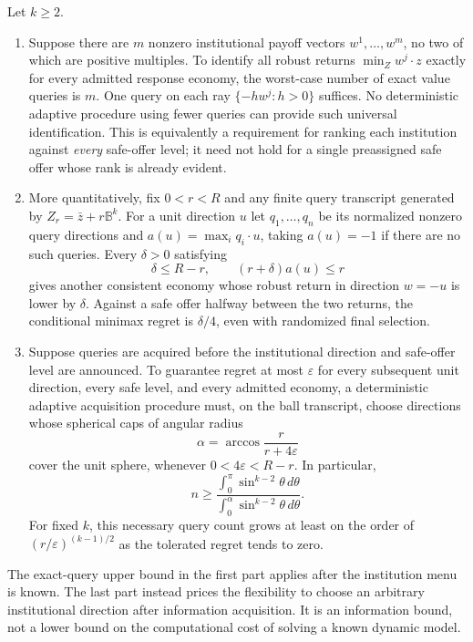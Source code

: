 \begin{theorem}
\label{thm:r19-query-complexity}
Let $k\geq2$.
\begin{enumerate}
\item Suppose there are $m$ nonzero institutional payoff vectors $w^1,\ldots,w^m$, no two of which are positive multiples. To identify all robust returns $\min_Z w^j\cdot z$ exactly for every admitted response economy, the worst-case number of exact value queries is $m$. One query on each ray $\{-hw^j:h>0\}$ suffices. No deterministic adaptive procedure using fewer queries can provide such universal identification. This is equivalently a requirement for ranking each institution against \emph{every} safe-offer level; it need not hold for a single preassigned safe offer whose rank is already evident.
\item More quantitatively, fix $0<r<R$ and any finite query transcript generated by $Z_r=\bar z+r\mathbb B^k$. For a unit direction $u$ let $q_1,\ldots,q_n$ be its normalized nonzero query directions and $a(u)=\max_i q_i\cdot u$, taking $a(u)=-1$ if there are no such queries. Every $\delta>0$ satisfying
\begin{equation}
 \delta\leq R-r,\qquad (r+\delta)a(u)\leq r
 \label{eq:r19-undetected-cap}
\end{equation}
gives another consistent economy whose robust return in direction $w=-u$ is lower by $\delta$. Against a safe offer halfway between the two returns, the conditional minimax regret is $\delta/4$, even with randomized final selection.
\item Suppose queries are acquired before the institutional direction and safe-offer level are announced. To guarantee regret at most $\varepsilon$ for every subsequent unit direction, every safe level, and every admitted economy, a deterministic adaptive acquisition procedure must, on the ball transcript, choose directions whose spherical caps of angular radius
\begin{equation}
 \alpha=\arccos\frac{r}{r+4\varepsilon}
 \label{eq:r19-angular-radius}
\end{equation}
cover the unit sphere, whenever $0<4\varepsilon<R-r$. In particular,
\begin{equation}
 n\geq\frac{\displaystyle\int_0^\pi\sin^{k-2}\theta\,d\theta}
 {\displaystyle\int_0^\alpha\sin^{k-2}\theta\,d\theta}.
 \label{eq:r19-query-cover}
\end{equation}
For fixed $k$, this necessary query count grows at least on the order of $(r/\varepsilon)^{(k-1)/2}$ as the tolerated regret tends to zero.
\end{enumerate}
The exact-query upper bound in the first part applies after the institution menu is known. The last part instead prices the flexibility to choose an arbitrary institutional direction after information acquisition. It is an information bound, not a lower bound on the computational cost of solving a known dynamic model.
\end{theorem}

